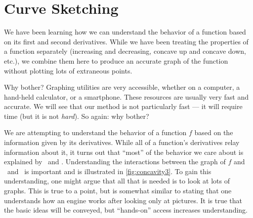 \section{Curve Sketching}\label{sec:sketch}

We have been learning how we can understand the behavior of a function based on its first and second derivatives. While we have been treating the properties of a function separately (increasing and decreasing, concave up and concave down, etc.), we combine them here to produce an accurate graph of the function without plotting lots of extraneous points.

Why bother? Graphing utilities are very accessible, whether on a computer, a hand-held calculator, or a smartphone. These resources are usually very fast and accurate. We will see that our method is not particularly fast --- it will require time (but it is not \textit{hard}). So again: why bother?


We are attempting to understand the behavior of a function $f$ based on the information given by its derivatives. While all of a function's derivatives relay information about it, it turns out that ``most'' of the behavior we care about is explained by \fp\ and \fpp. Understanding the interactions between the graph of $f$ and \fp\ and \fpp\ is important and is illustrated in \autoref{fig:concavity3}. To gain this understanding, one might argue that all that is needed is to look at lots of graphs. This is true to a point, but is somewhat similar to stating that one understands how an engine works after looking only at pictures. It is true that the basic ideas will be conveyed, but ``hands-on'' access increases understanding.

